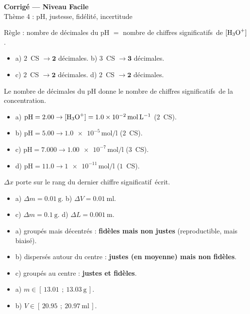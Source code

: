\documentclass[11pt,a4paper]{article}
\newcommand{\cs}{chiffre significatif}
\newcommand{\CS}{chiffres significatifs}
\begin{document}
\begin{center}
{\Large\bfseries\color{primarydark} Corrigé — Niveau Facile}\\[1pt]
{\color{primary} Thème 4 : pH, justesse, fidélité, incertitude}
\end{center}
\vspace{2mm}

\begin{cor}
Règle : nombre de décimales du pH $=$ nombre de \CS\ de $[\ce{H3O+}]$.
\begin{itemize}[leftmargin=1.6em,itemsep=1pt]
  \item a) $2$~CS $\to \mathbf{2}$ décimales. \quad b) $3$~CS $\to \mathbf{3}$ décimales.
  \item c) $2$~CS $\to \mathbf{2}$ décimales. \quad d) $2$~CS $\to \mathbf{2}$ décimales.
\end{itemize}
\end{cor}

\begin{cor}
Le nombre de décimales du pH donne le nombre de \CS\ de la concentration.
\begin{itemize}[leftmargin=1.6em,itemsep=1pt]
  \item a) $\mathrm{pH}=\num{2,00} \to [\ce{H3O+}]=\num{1,0e-2}\,\si{\mol\per\litre}$ ($2$~CS).
  \item b) $\mathrm{pH}=\num{5,00} \to \num{1,0e-5}\,\si{\mol\per\litre}$ ($2$~CS).
  \item c) $\mathrm{pH}=\num{7,000} \to \num{1,00e-7}\,\si{\mol\per\litre}$ ($3$~CS).
  \item d) $\mathrm{pH}=\num{11,0} \to \num{1e-11}\,\si{\mol\per\litre}$ ($1$~CS).
\end{itemize}
\end{cor}

\begin{cor}
$\Delta x$ porte sur le rang du dernier \cs\ écrit.
\begin{itemize}[leftmargin=1.6em,itemsep=1pt]
  \item a) $\Delta m=\qty{0,01}{\gram}$. \quad b) $\Delta V=\qty{0,01}{\milli\litre}$.
  \item c) $\Delta m=\qty{0,1}{\gram}$. \quad d) $\Delta L=\qty{0,001}{\metre}$.
\end{itemize}
\end{cor}

\begin{cor}
\begin{itemize}[leftmargin=1.6em,itemsep=1pt]
  \item a) groupés mais décentrés : \textbf{fidèles mais non justes} (reproductible, mais biaisé).
  \item b) dispersés autour du centre : \textbf{justes (en moyenne) mais non fidèles}.
  \item c) groupés au centre : \textbf{justes et fidèles}.
\end{itemize}
\end{cor}

\begin{cor}
\begin{itemize}[leftmargin=1.6em,itemsep=1pt]
  \item a) $m\in[\,\qty{13,01}{}\,;\ \qty{13,03}{\gram}\,]$.
  \item b) $V\in[\,\qty{20,95}{}\,;\ \qty{20,97}{\milli\litre}\,]$.
\end{itemize}
\end{cor}
\end{document}
